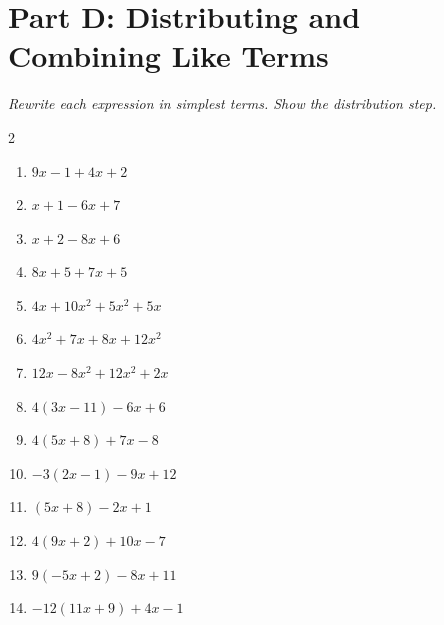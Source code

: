 \documentclass[11pt]{article}
\begin{document}
\section*{Part D: Distributing and Combining Like Terms}
\noindent\textit{Rewrite each expression in simplest terms. Show the distribution step.}
\begin{multicols}{2}
\begin{enumerate}
  \item $9x - 1 + 4x + 2$
  \vspace{1.3cm}
  \item $x + 1 - 6x + 7$
  \vspace{1.3cm}
  \item $x + 2 - 8x + 6$
  \vspace{1.3cm}
  \item $8x + 5 + 7x + 5$
  \vspace{1.3cm}
  \item $4x + 10x^{2} + 5x^{2} + 5x$
  \vspace{1.3cm}
  \item $4x^{2} + 7x + 8x + 12x^{2}$
  \vspace{1.3cm}
  \item $12x - 8x^{2} + 12x^{2} + 2x$
  \vspace{1.3cm}
  \item $4(3x - 11) - 6x + 6$
  \vspace{1.3cm}
  \item $4(5x + 8) + 7x - 8$
  \vspace{1.3cm}
  \item $-3(2x - 1) - 9x + 12$
  \vspace{1.3cm}
  \item $(5x + 8) - 2x + 1$
  \vspace{1.3cm}
  \item $4(9x + 2) + 10x - 7$
  \vspace{1.3cm}
  \item $9(-5x + 2) - 8x + 11$
  \vspace{1.3cm}
  \item $-12(11x + 9) + 4x - 1$
  \vspace{1.3cm}
\end{enumerate}
\end{multicols}
\end{document}
